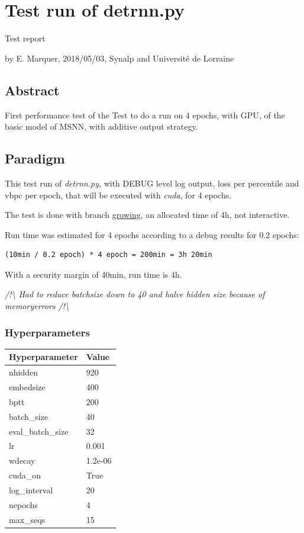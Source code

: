 \section*{Test run of detrnn.py}

Test report

by E. Marquer, 2018/05/03, Synalp and Université de Lorraine

\subsection{Abstract}

First performance test of the Test to do a run on 4 epochs, with GPU, of
the basic model of MSNN, with additive output strategy.

\subsection{Paradigm}

This test run of \emph{detrnn.py}, with DEBUG level log output, loss per
percentile and vbpc per epoch, that will be executed with \emph{cuda},
for 4 epochs.

The test is done with branch
\href{https://gitlab.inria.fr/emarquer/awd-lstm-lm/tree/growing}{growing},
an allocated time of 4h, not interactive.

Run time was estimated for 4 epochs according to a debug results for 0.2
epochs:

\begin{lstlisting}
(10min / 0.2 epoch) * 4 epoch = 200min = 3h 20min
\end{lstlisting}

With a security margin of 40min, run time is 4h.

\emph{/!\textbackslash{} Had to reduce batchsize down to 40 and halve
hidden size because of memoryerrors /!\textbackslash{}}

\newpage
\subsubsection{Hyperparameters}

\begin{longtable}[]{@{}ll@{}}
\hline
Hyperparameter & Value\tabularnewline
\hline
\endhead
nhidden & 920\tabularnewline
embedsize & 400\tabularnewline
bptt & 200\tabularnewline
batch\_size & 40\tabularnewline
eval\_batch\_size & 32\tabularnewline
lr & 0.001\tabularnewline
wdecay & 1.2e-06\tabularnewline
cuda\_on & True\tabularnewline
log\_interval & 20\tabularnewline
nepochs & 4\tabularnewline
max\_seqs & 15\tabularnewline
\hline
\end{longtable}

